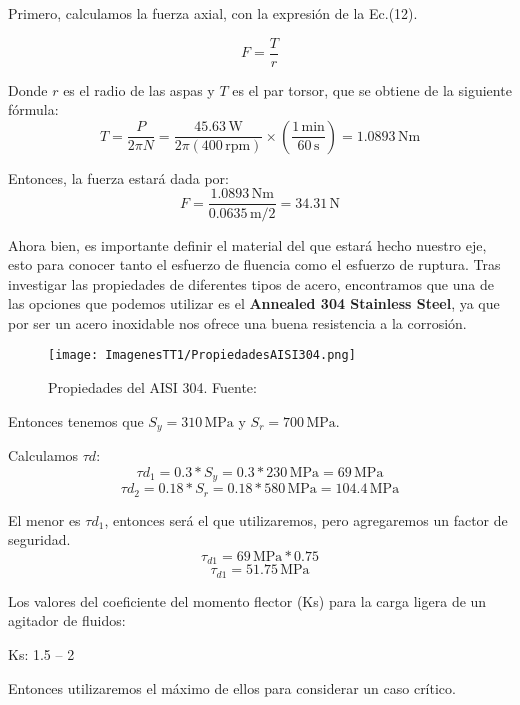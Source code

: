 \documentclass[14pt,oneside]{extarticle} %
\begin{document}
Primero, calculamos la fuerza axial, con la expresión de la Ec.(12).

\begin{equation}
F = \frac{T}{r}
\end{equation}

Donde \( r \) es el radio de las aspas y \( T \) es el par torsor, que se obtiene de la siguiente fórmula:
\begin{equation*}
T = \frac{P}{2\pi N} = \frac{45.63\, \text{W}}{2\pi (400\, \text{rpm})} \times \left(\frac{1\, \text{min}}{60\, \text{s}}\right) = 1.0893\, \text{Nm}
\end{equation*}

Entonces, la fuerza estará dada por:
\begin{equation*}
F = \frac{1.0893\, \text{Nm}}{0.0635\, \text{m} / 2} = 34.31\, \text{N}
\end{equation*}

Ahora bien, es importante definir el material del que estará hecho nuestro eje, esto para conocer tanto el esfuerzo de fluencia como el esfuerzo de ruptura.
Tras investigar las propiedades de diferentes tipos de acero, encontramos que una de las opciones que podemos utilizar es el \textbf{Annealed 304 Stainless Steel}, ya que por ser un acero inoxidable nos ofrece una buena resistencia a la corrosión.

\begin{figure}[H]
    \centering
    \texttt{[image: ImagenesTT1/PropiedadesAISI304.png]}
    \caption{Propiedades del AISI 304. Fuente:\cite{PropiedadesAISI304}}
    \label{fig:AISI304}
\end{figure}

\newpage

Entonces tenemos que \( S_y = 310\, \text{MPa} \) y \( S_r = 700\, \text{MPa} \).

Calculamos \( \tau d \):
\[ \tau d_{1} = 0.3 \ast S_y = 0.3 \ast 230\, \text{MPa} = 69\, \text{MPa} \]
\[ \tau d_{2} = 0.18 \ast S_r = 0.18 \ast 580\, \text{MPa} = 104.4\, \text{MPa} \]

El menor es \( \tau d_{1} \), entonces será el que utilizaremos, pero agregaremos un factor de seguridad.
\[ \tau_{d1} = 69\, \text{MPa} \ast 0.75 \]
\[ \tau_{d1} = 51.75\, \text{MPa} \]

Los valores del coeficiente del momento flector (Ks) para la carga ligera de un agitador de fluidos:

Ks: 1.5 -- 2

Entonces utilizaremos el máximo de ellos para considerar un caso crítico.
\end{document}

